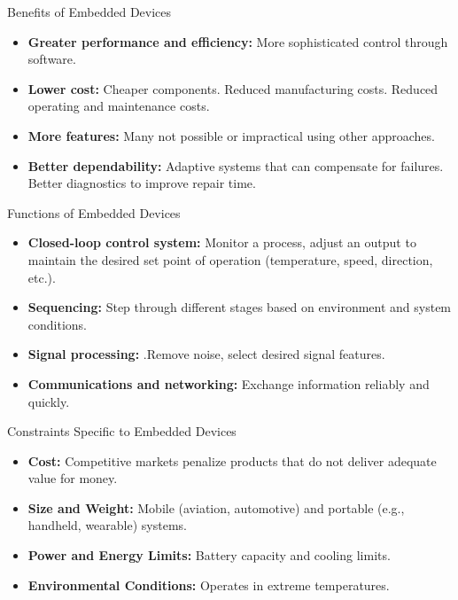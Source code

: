 \begin{frame}{Benefits of Embedded Devices}
  \begin{itemize}
    \item \textbf{Greater performance and efficiency:} More sophisticated control through software.
    \item \textbf{Lower cost:} Cheaper components. Reduced manufacturing costs. Reduced operating and maintenance costs.
    \item \textbf{More features:} Many not possible or impractical using other approaches.
    \item \textbf{Better dependability:} Adaptive systems that can compensate for failures. Better diagnostics to improve repair time.
  \end{itemize}
\end{frame}

\begin{frame}{Functions of Embedded Devices}
  \begin{itemize}
    \item \textbf{Closed-loop control system:} Monitor a process, adjust an output to maintain the desired set point of operation (temperature, speed, direction, etc.).
    \item \textbf{Sequencing:} Step through different stages based on environment and system conditions.
    \item \textbf{Signal processing:} .Remove noise, select desired signal features.
    \item \textbf{Communications and networking:} Exchange information reliably and quickly.
  \end{itemize}
\end{frame}

\begin{frame}{Constraints Specific to Embedded Devices}
  \begin{itemize}
    \item \textbf{Cost:} Competitive markets penalize products that do not deliver adequate value for money.
    \item \textbf{Size and Weight:} Mobile (aviation, automotive) and portable (e.g., handheld, wearable) systems.
    \item \textbf{Power and Energy Limits:} Battery capacity and cooling limits.
    \item \textbf{Environmental Conditions:} Operates in extreme temperatures.
  \end{itemize}
\end{frame}

